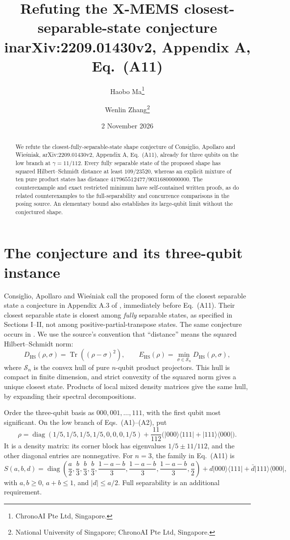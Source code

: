 \documentclass[11pt]{article}
\title{Refuting the X-MEMS closest-separable-state conjecture in\break arXiv:2209.01430v2, Appendix A, Eq.~(A11)}
\author{Haobo Ma\thanks{ChronoAI Pte Ltd, Singapore.}\and
Wenlin Zhang\thanks{National University of Singapore; ChronoAI Pte Ltd, Singapore.}}
\date{2 November 2026}
\newcommand{\Sep}{\mathcal S}
\newcommand{\ket}[1]{\lvert #1\rangle}
\newcommand{\bra}[1]{\langle #1\rvert}
\newcommand{\Tr}{\operatorname{Tr}}
\newcommand{\diag}{\operatorname{diag}}
\newcommand{\E}{E_{\mathrm{HS}}}
\newcommand{\D}{D_{\mathrm{HS}}}
\begin{document}
\maketitle
\begin{abstract}
We refute the closest-fully-separable-state shape conjecture of Consiglio,
Apollaro and Wie\'sniak, arXiv:2209.01430v2, Appendix A, Eq.~(A11), already
for three qubits on the low branch at $\gamma=11/112$.
Every fully separable state of the proposed shape has squared
Hilbert--Schmidt distance at least $109/23520$, whereas an explicit mixture
of ten pure product states has distance
$417965512477/90316800000000$.
The counterexample and exact restricted minimum have self-contained written
proofs, as do related counterexamples to the full-separability and concurrence
comparisons in the posing source. An elementary bound also establishes its large-qubit limit
without the conjectured shape.
\end{abstract}

\section{The conjecture and its three-qubit instance}
Consiglio, Apollaro and Wie\'sniak call the proposed form of the closest
separable state a conjecture in Appendix A.3 of \cite{CAW}, immediately
before Eq.~(A11). Their closest separable state is closest among
\emph{fully} separable states, as specified in Sections I--II, not among
positive-partial-transpose states. The same conjecture occurs in
\cite[Appendix C.3, Eq.~(C.12)]{Thesis}. We use the source's convention that
``distance'' means the squared Hilbert--Schmidt norm:
\[
 \D(\rho,\sigma)=\Tr((\rho-\sigma)^2),\qquad
 \E(\rho)=\min_{\sigma\in\Sep_n}\D(\rho,\sigma),
\]
where $\Sep_n$ is the convex hull of pure $n$-qubit product projectors.
This hull is compact in finite dimension, and strict convexity of the squared
norm gives a unique closest state. Products of local mixed density matrices
give the same hull, by expanding their spectral decompositions.

Order the three-qubit basis as $000,001,\ldots,111$, with the first qubit
most significant. On the low branch of Eqs.~(A1)--(A2), put
\begin{equation}\label{eq:rho}
 \rho=\diag(1/5,1/5,1/5,1/5,0,0,0,1/5)
       +\frac{11}{112}\bigl(\ket{000}\bra{111}+\ket{111}\bra{000}\bigr).
\end{equation}
It is a density matrix: its corner block has eigenvalues
$1/5\pm11/112$, and the other diagonal entries are nonnegative.
For $n=3$, the family in Eq.~(A11) is
\begin{equation}\label{eq:shape}
 S(a,b,d)=\diag\left(\frac a2,\frac b3,\frac b3,\frac b3,
  \frac{1-a-b}{3},\frac{1-a-b}{3},\frac{1-a-b}{3},\frac a2\right)
  +d\ket{000}\bra{111}+\bar d\ket{111}\bra{000},
\end{equation}
with $a,b\ge0$, $a+b\le1$, and $|d|\le a/2$.
Full separability is an additional requirement.
\end{document}

